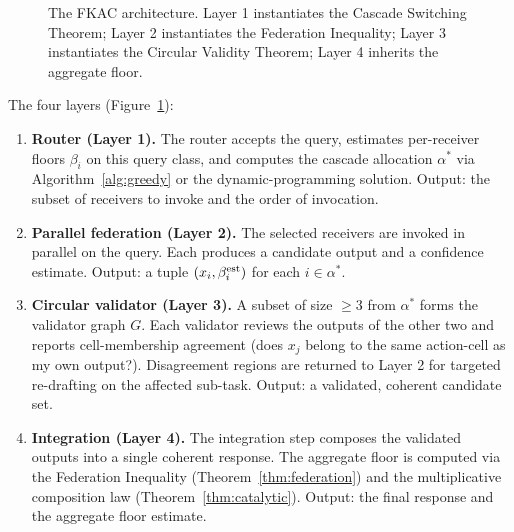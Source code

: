 \documentclass[11pt,twocolumn,a4paper]{article}
\theoremstyle{definition}
\theoremstyle{remark}
\begin{document}
\begin{figure}[t]
\centering
{}
\caption{The FKAC architecture. Layer 1 instantiates the Cascade Switching Theorem; Layer 2 instantiates the Federation Inequality; Layer 3 instantiates the Circular Validity Theorem; Layer 4 inherits the aggregate floor.}
\label{fig:arch}
\end{figure}

The four layers (Figure~\ref{fig:arch}):

\begin{enumerate}[leftmargin=*,nosep]
\item \textbf{Router (Layer 1).} The router accepts the query, estimates per-receiver floors $\beta_i$ on this query class, and computes the cascade allocation $\alpha^*$ via Algorithm~\ref{alg:greedy} or the dynamic-programming solution. Output: the subset of receivers to invoke and the order of invocation.
\item \textbf{Parallel federation (Layer 2).} The selected receivers are invoked in parallel on the query. Each produces a candidate output and a confidence estimate. Output: a tuple $(x_i, \beta_i^{\rm est})$ for each $i \in \alpha^*$.
\item \textbf{Circular validator (Layer 3).} A subset of size $\geq 3$ from $\alpha^*$ forms the validator graph $G$. Each validator reviews the outputs of the other two and reports cell-membership agreement (does $x_j$ belong to the same action-cell as my own output?). Disagreement regions are returned to Layer 2 for targeted re-drafting on the affected sub-task. Output: a validated, coherent candidate set.
\item \textbf{Integration (Layer 4).} The integration step composes the validated outputs into a single coherent response. The aggregate floor is computed via the Federation Inequality (Theorem~\ref{thm:federation}) and the multiplicative composition law (Theorem~\ref{thm:catalytic}). Output: the final response and the aggregate floor estimate.
\end{enumerate}
\end{document}
